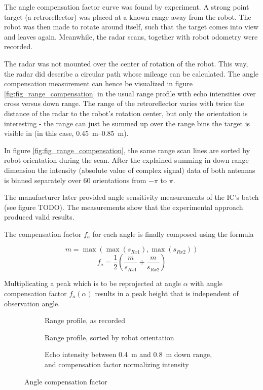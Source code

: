 The angle compensation factor curve was found by experiment. A strong
point target (a retroreflector) was placed at a known range away from
the robot. The robot was then made to rotate around itself, such that
the target comes into view and leaves again. Meanwhile, the radar scans,
together with robot odometry were recorded.

The radar was not mounted over the center of rotation of the robot. This
way, the radar did describe a circular path whose mileage can be
calculated. The angle compensation measurement can hence be visualized
in figure \cref{fig:fig_range_compensation} in the usual range profile with echo intensities over
cross versus down range. The range of the retroreflector varies with
twice the distance of the radar to the robot's rotation center, but only
the orientation is interesting - the range can just be summed up over
the range bins the target is visible in (in this case,
\SIrange{0.45}{0.85}{m}).

In figure \cref{fig:fig_range_compensation}, the same range scan lines are sorted by robot
orientation during the scan. After the explained summing in down range
dimension the intensity (absolute value of complex signal) data of both
antennas is binned separately over 60 orientations from \(-\pi\) to
\(\pi\).

The manufacturer later provided angle sensitivity measurements of the
IC's batch (see figure TODO). The measurements show that the
experimental approach produced valid results.

The compensation factor \(f_a\) for each angle is finally composed using
the formula

\[m = \max \left( \max (s_{Rx1}), \max (s_{Rx2}) \right)\] \[
f_a = \frac{1}{2}
  \left(
    \frac{m}{ s_{Rx1} } +
    \frac{m}{ s_{Rx2} }
  \right)
\]

Multiplicating a peak which is to be reprojected at angle \(\alpha\)
with angle compensation factor \(f_a(\alpha)\) results in a peak height
that is independent of observation angle.

\begin{figure}[htbp]
    \centering
    \begin{subfigure}{\textwidth}
        \centering
        \def\svgscale{0.8} \small
        
        \caption{Range profile, as recorded}
        \bigskip
    \end{subfigure}
    \begin{subfigure}{\textwidth}
        \centering
        \def\svgscale{0.8} \small
        
        \caption{Range profile, sorted by robot orientation}
        \bigskip
    \end{subfigure}
    \begin{subfigure}{\textwidth}
        \centering
        \def\svgscale{0.8} \small
        
        \caption{Echo intensity between \SI{0.4}{m} and \SI{0.8}{m} down range, and compensation factor normalizing intensity}
        \bigskip
    \end{subfigure}
    \caption{Angle compensation factor}
    \label{fig:fig_angle_compensation}
\end{figure}

